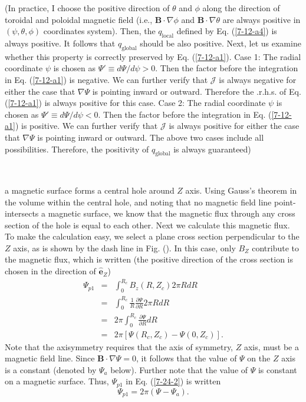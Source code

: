 \documentclass{llncs}
\newcommand{\tmop}[1]{\ensuremath{\operatorname{#1}}}
\begin{document}
(In practice, I choose the positive direction of $\theta$ and $\phi$ along the
direction of toroidal and poloidal magnetic field (i.e., $\mathbf{B} \cdot
\nabla \phi$ and $\mathbf{B} \cdot \nabla \theta$ are always positive in
$(\psi, \theta, \phi)$ coordinates system). Then, the $q_{\tmop{local}}$
defined by Eq. (\ref{7-12-a4}) is always positive. It follows that
$q_{\tmop{global}}$ should be also positive. Next, let us examine whether this
property is correctly preserved by Eq. (\ref{7-12-a1}). Case 1: The radial
coordinate $\psi$ is chosen as $\Psi' \equiv d \Psi / d \psi > 0$. Then the
factor before the integration in Eq. (\ref{7-12-a1}) is negative. We can
further verify that $\mathcal{J}$ is always negative for either the case that
$\nabla \Psi$ is pointing inward or outward. Therefore the .r.h.s. of Eq.
(\ref{7-12-a1}) is always positive for this case. Case 2: The radial
coordinate $\psi$ is chosen as $\Psi' \equiv d \Psi / d \psi < 0$. Then the
factor before the integration in Eq. (\ref{7-12-a1}) is positive. We can
further verify that $\mathcal{J}$ is always positive for either the case that
$\nabla \Psi$ is pointing inward or outward. The above two cases include all
possibilities. Therefore, the positivity of $q_{\tmop{global}}$ is always
guaranteed)

\

a magnetic surface forms a central hole around $Z$ axis. Using Gauss's
theorem in the volume within the central hole, and noting that no magnetic
field line point-intersects a magnetic surface, we know that the magnetic flux
through any cross section of the hole is equal to each other. Next we
calculate this magnetic flux. To make the calculation easy, we select a plane
cross section perpendicular to the $Z$ axis, as is shown by the dash line in
Fig. (). In this case, only $B_Z$ contribute to the magnetic flux, which is
written (the positive direction of the cross section is chosen in the
direction of $\hat{\mathbf{e}}_Z$)
\begin{eqnarray*}
  \Psi_{p 1} & = & \int_0^{R_c} B_z (R, Z_c) 2 \pi R d R\\
  & = & \int_0^{R_c} \frac{1}{R}  \frac{\partial \Psi}{\partial R} 2 \pi R d
  R\\
  & = & 2 \pi \int_0^{R_c} \frac{\partial \Psi}{\partial R} d R\\
  & = & 2 \pi [\Psi (R_c, Z_c) - \Psi (0, Z_c)] .
\end{eqnarray*}
Note that the axisymmetry requires that the axis of symmetry, $Z$ axis, must
be a magnetic field line. Since $\mathbf{B} \cdot \nabla \Psi = 0$, it follows
that the value of $\Psi$ on the $Z$ axis is a constant (denoted by $\Psi_a$
below). Further note that the value of $\Psi$ is constant on a magnetic
surface. Thus, $\Psi_{p 1}$ in Eq. (\ref{7-24-2}) is written
\begin{equation}
  \label{12-30-1} \Psi_{p 1} = 2 \pi (\Psi - \Psi_a) .
\end{equation}
\end{document}
